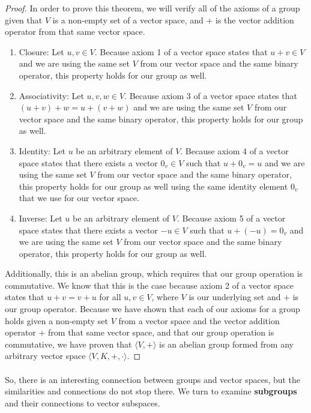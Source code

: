 \documentclass[twoside]{article}
\newcommand{\done}{\renewcommand\qedsymbol{$\blacksquare$}}
\begin{document}
\begin{proof}
    In order to prove this theorem, we will verify all of the axioms of a group
    given that $V$ is a non-empty set of a vector space, and $+$ is the vector 
    addition operator from that same vector space. 
    \begin{enumerate}
      \item Closure: Let $u,v \in V$. Because axiom 1 of a vector space states that
      $u+v \in V$ and we are using the same set $V$ from our vector space and the 
      same binary operator, this property holds for our group as well.
      \item Associativity: Let $u,v,w \in V$. Because axiom 3 of a vector space states that
      $(u+v)+w = u+(v+w)$ and we are using the same set $V$ from our vector space and the
      same binary operator, this property holds for our group as well.
      \item Identity: Let $u$ be an arbitrary element of $V$. Because axiom 4 of a vector space states that
      there exists a vector $0_v \in V$ such that $u+0_v = u$ and we are using the same set $V$ from our vector space and the
      same binary operator, this property holds for our group as well using the 
      same identity element $0_v$ that we use for our vector space.
      \item Inverse: Let $u$ be an arbitrary element of $V$. Because axiom 5 of a vector space states that
      there exists a vector $-u \in V$ such that $u+(-u) = 0_v$ and we are using the same set $V$ from our vector space and the
      same binary operator, this property holds for our group as well.
    \end{enumerate}

Additionally, this is an abelian group, which requires that our group operation 
is commutative. We know that this is the case because axiom 2 of a vector space states that
$u+v = v+u$ for all $u,v \in V$, where $V$ is our underlying set and $+$ is our group operator.
Because we have shown that each of our axioms for a group holds given a non-empty 
set $V$ from a vector space and the vector addition operator $+$ from that same
vector space, and that our group operation is commutative, we have proven that
$\langle V, + \rangle$ is an abelian group formed from any arbitrary vector space 
$\langle V, K, +, \cdot \rangle$.
\done  
\end{proof}

\paragraph*{} So, there is an interesting connection between groups and vector spaces,
but the similarities and connections do not stop there. We turn to examine 
\textbf{subgroups} and their connections to vector subspaces.
\end{document}
